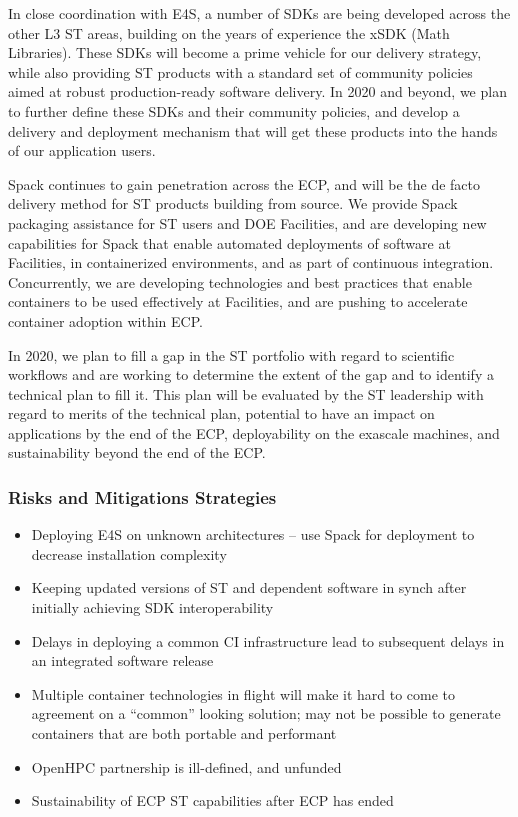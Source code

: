 In close coordination with E4S, a number of SDKs are being developed across the other L3 ST areas, building on the years of experience the xSDK (Math Libraries).  These SDKs will become a prime vehicle for our delivery strategy, while also providing ST products with a standard set of community policies aimed at robust production-ready software delivery. In 2020 and beyond, we plan to further define these SDKs and their community policies, and develop a delivery and deployment mechanism that will get these products into the hands of our application users.

Spack continues to gain penetration across the ECP, and will be the de facto delivery method for ST products building from source. We provide Spack packaging assistance for ST users and DOE Facilities, and are developing new capabilities for Spack that enable automated deployments of software at Facilities, in containerized environments, and as part of continuous integration. Concurrently, we are developing technologies and best practices that enable containers to be used effectively at Facilities, and are pushing to accelerate container adoption within ECP.

In 2020, we plan to fill a gap in the ST portfolio with regard to scientific workflows and are working to determine the extent of the gap and to identify a technical plan to fill it.  This plan will be evaluated by the ST leadership with regard to merits of the technical plan, potential to have an impact on applications by the end of the ECP, deployability on the exascale machines, and sustainability beyond the end of the ECP.

\subsubsection{Risks and Mitigations Strategies}
\begin{itemize}
	\item Deploying E4S on unknown architectures -- use Spack for deployment to decrease installation complexity
        \item Keeping updated versions of ST and dependent software in synch after initially achieving SDK interoperability
	\item Delays in deploying a common CI infrastructure lead to subsequent delays in an integrated software release
	\item Multiple container technologies in flight will make it hard to come to agreement on a ``common'' looking solution; may not be possible to generate containers that are both portable and performant
	\item OpenHPC partnership is ill-defined, and unfunded
	\item Sustainability of ECP ST capabilities after ECP has ended
\end{itemize}

